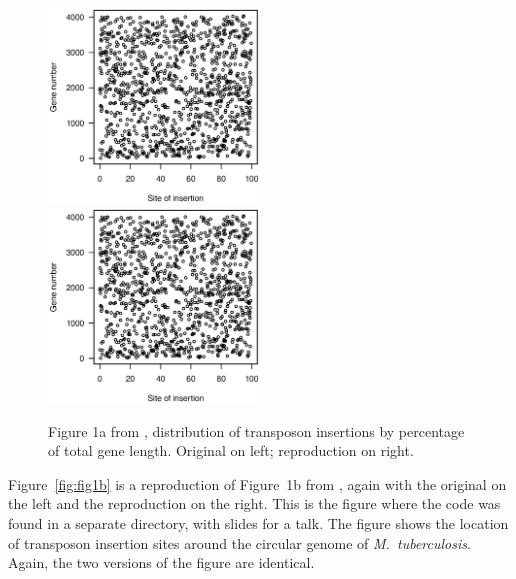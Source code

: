 \begin{figure}
\includegraphics[viewport=133 224 464 528, width=0.50\textwidth]{../original/Nov02/R/Figs/fig1.ps}
\hfill
\includegraphics[viewport=133 224 464 528, width=0.50\textwidth]{../reproduction/Figs/fig1.ps}

\caption{Figure 1a from \citet{lamichhane2003}, distribution of
transposon insertions by percentage of total gene length. Original on left;
reproduction on right.\label{fig:fig1a}}
\end{figure}

Figure~\ref{fig:fig1b} is a reproduction of Figure~1b
from \citet{lamichhane2003}, again with the original on the left and
the reproduction on the right. This is the figure where the code was
found in a separate directory, with slides for a talk. The figure
shows the location of transposon insertion sites around the circular
genome of \emph{M.\ tuberculosis}. Again, the two versions of the
figure are identical.

